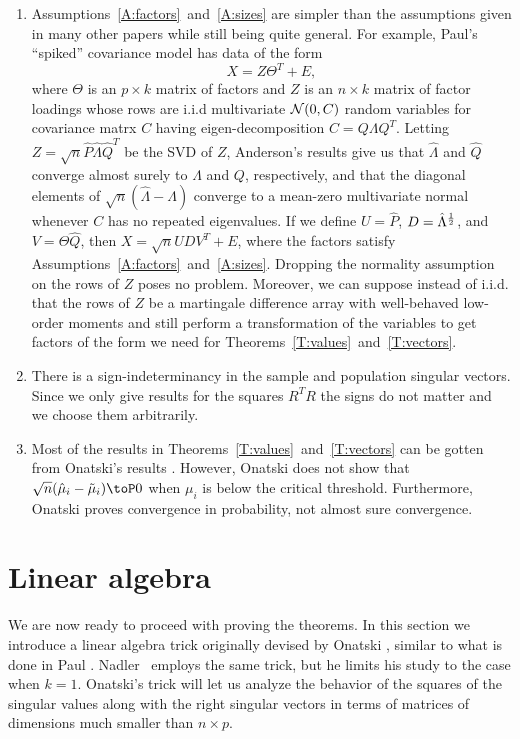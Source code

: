 \begin{enumerate}
    
\item
Assumptions~\ref{A:factors}~and~\ref{A:sizes} are simpler than the assumptions given in many other papers while still being quite general.  For example, Paul's ``spiked'' covariance model has data of the form
\[
    X = Z \Theta^T + E,
\]
where $\Theta$ is an $p \times k$ matrix of factors and $Z$ is an $n\times k$ matrix of factor loadings whose rows are i.i.d multivariate $\mathcal{N}(0,C)$ random variables for covariance matrx $C$ having eigen-decomposition $C = Q \Lambda Q^T$.  Letting $Z = \sqrt{n} \hat P \hat \Lambda \hat Q^T$ be the SVD of $Z$, Anderson's results \cite{anderson1963atp} give us that $\hat \Lambda$ and $\hat Q$ converge almost surely to $\Lambda$ and $Q$, respectively, and that the diagonal elements of $\sqrt{n} (\hat \Lambda - \Lambda)$ converge to a mean-zero multivariate normal whenever $C$ has no repeated eigenvalues.  If we define $U = \hat P$, $D = \hat \Lambda^{\frac{1}{2}}$, and $V = \Theta \hat Q$, then $X = \sqrt{n} U D V^T + E$, where the factors satisfy Assumptions~\ref{A:factors}~and~\ref{A:sizes}.  Dropping the normality assumption on the rows of $Z$ poses no problem.  Moreover, we can suppose instead of i.i.d. that the rows of $Z$ be a martingale difference array with well-behaved low-order moments and still perform a transformation of the variables to get factors of the form we need for Theorems~\ref{T:values}~and~\ref{T:vectors}.

\item
There is a sign-indeterminancy in the sample and population singular vectors. Since we only give results for the squares $R^T R$ the signs do not matter and we choose them arbitrarily.

\item 
Most of the results in Theorems~\ref{T:values}~and~\ref{T:vectors} can be gotten from Onatski's results \cite{onatski}.   However, Onatski does not show that $\sqrt{n} (\hat \mu_i - \tilde \mu_i) \toP 0$ when $\mu_i$ is below the critical threshold.  Furthermore, Onatski proves convergence in probability, not almost sure convergence.

\end{enumerate}

\section{Linear algebra}\label{S:linalg}

We are now ready to proceed with proving the theorems.  In this section we introduce a linear algebra trick originally devised by Onatski \cite{onatski}, similar to what is done in Paul \cite{paul2007ase}.  Nadler~\cite{nadler2008fsa} employs the same trick, but he limits his study to the case when $k = 1$. Onatski's trick will let us analyze the behavior of the squares of the singular values along with the right singular vectors in terms of matrices of dimensions much smaller than $n \times p$.

